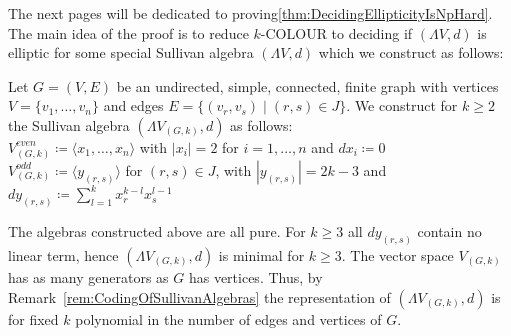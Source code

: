  The next pages will be dedicated to proving\ref{thm:DecidingEllipticityIsNpHard}.
 The main idea of the proof is to reduce $k$-COLOUR to deciding if $(\Lambda V,d)$ is elliptic for some special 
 Sullivan algebra $(\Lambda V,d)$ which we construct as follows: 
 
 \begin{Construction}
\label{constructionOfSullivanAlgebra}
 Let $G = (V,E)$ be an undirected, simple, connected, finite graph with vertices $ V = \lbrace v_1, \dotsc , v_n \rbrace $
 and edges $ E = \lbrace (v_r, v_s) \; | \; (r,s) \in J \rbrace$. We construct for $k \geq 2$ the 
 Sullivan algebra $(\Lambda V_{(G,k)} , d)$ as follows: \\
 
 $ V^{even}_{(G,k)} \coloneqq \langle x_1, \dotsc , x_n \rangle $  with $|x_i| = 2$ for $ i = 1, \dotsc , n$  
 and  $dx_i \coloneqq 0$ \\
 
 $V^{odd}_{(G,k)} \coloneqq \langle y_{(r,s)} \rangle$ for $(r,s) \in J$, with $|y_{(r,s)}| = 2k - 3$  and  $dy_{(r,s)} \coloneqq 
 \sum_{l = 1}^k x_r^{k -l} x_s^{l - 1}$ \\
 
 \end{Construction}

\begin{Remark}
  The algebras constructed above are all pure. For 
  $k \geq 3$ all $dy_{(r,s)}$ contain no linear term, hence
  $(\Lambda V_{(G,k)} ,d)$ is minimal for $k \geq 3$.
  The vector space
  $V_{(G,k)}$ has as many generators as $G$ has vertices. Thus, by Remark~\ref{rem:CodingOfSullivanAlgebras}
  the representation of $(\Lambda V_{(G,k)} ,d)$ is for fixed $k$ polynomial in the number of edges and vertices of $G$.
%   
%   
\end{Remark}

